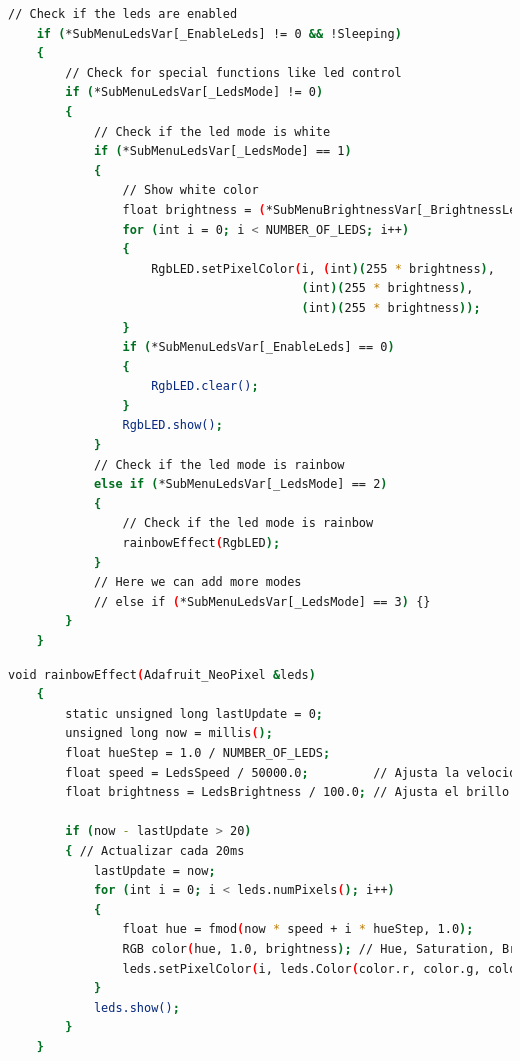 \begin{lstlisting}[style=console, language=bash, caption={Funciones de los modos de los Leds en el main.cpp}, label={code:LedsModes}]
    // Check if the leds are enabled
    if (*SubMenuLedsVar[_EnableLeds] != 0 && !Sleeping)
    {
        // Check for special functions like led control
        if (*SubMenuLedsVar[_LedsMode] != 0)
        {
            // Check if the led mode is white
            if (*SubMenuLedsVar[_LedsMode] == 1)
            {
                // Show white color
                float brightness = (*SubMenuBrightnessVar[_BrightnessLeds] / 100.0f);
                for (int i = 0; i < NUMBER_OF_LEDS; i++)
                {
                    RgbLED.setPixelColor(i, (int)(255 * brightness),
                                         (int)(255 * brightness),
                                         (int)(255 * brightness));
                }
                if (*SubMenuLedsVar[_EnableLeds] == 0)
                {
                    RgbLED.clear();
                }
                RgbLED.show();
            }
            // Check if the led mode is rainbow
            else if (*SubMenuLedsVar[_LedsMode] == 2)
            {
                // Check if the led mode is rainbow
                rainbowEffect(RgbLED);
            }
            // Here we can add more modes
            // else if (*SubMenuLedsVar[_LedsMode] == 3) {}
        }
    }
\end{lstlisting}

\begin{lstlisting}[style=console, language=bash, caption={Ejemplo de función de arcoíris en los leds en el ModernWood.cpp}, label={code:LedsExampleCode}]
    void rainbowEffect(Adafruit_NeoPixel &leds)
    {
        static unsigned long lastUpdate = 0;
        unsigned long now = millis();
        float hueStep = 1.0 / NUMBER_OF_LEDS;
        float speed = LedsSpeed / 50000.0;		   // Ajusta la velocidad
        float brightness = LedsBrightness / 100.0; // Ajusta el brillo

        if (now - lastUpdate > 20)
        { // Actualizar cada 20ms
            lastUpdate = now;
            for (int i = 0; i < leds.numPixels(); i++)
            {
                float hue = fmod(now * speed + i * hueStep, 1.0);
                RGB color(hue, 1.0, brightness); // Hue, Saturation, Brightness
                leds.setPixelColor(i, leds.Color(color.r, color.g, color.b));
            }
            leds.show();
        }
    }
\end{lstlisting}

